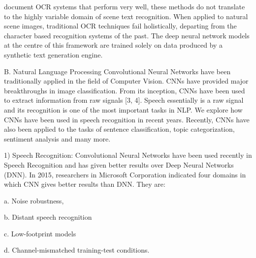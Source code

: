 \documentclass[12pt]{article}
\begin{document}
document OCR systems that perform very well, these
methods do not translate to the highly variable domain of
scene text recognition. When applied to natural scene
images, traditional OCR techniques fail holistically,
departing from the character based recognition systems of
the past. The deep neural network models at the centre of
this framework are trained solely on data produced by a
synthetic text generation engine.

B. Natural Language Processing
Convolutional Neural Networks have been traditionally
applied in the field of Computer Vision. CNNs have
provided major breakthroughs in image classification. From
its inception, CNNs have been used to extract information
from raw signals [3, 4]. Speech essentially is a raw signal
and its recognition is one of the most important tasks in
NLP. We explore how CNNs have been used in speech
recognition in recent years. Recently, CNNs have also been
applied to the tasks of sentence classification, topic
categorization, sentiment analysis and many more.

1) Speech Recognition: Convolutional Neural Networks
have been used recently in Speech Recognition and has
given better results over Deep Neural Networks (DNN). In
2015, researchers in Microsoft Corporation indicated four
domains in which CNN gives better results than DNN.
They are:

a. Noise robustness,

b. Distant speech recognition


c. Low-footprint models

d. Channel-mismatched training-test conditions.
\end{document}
